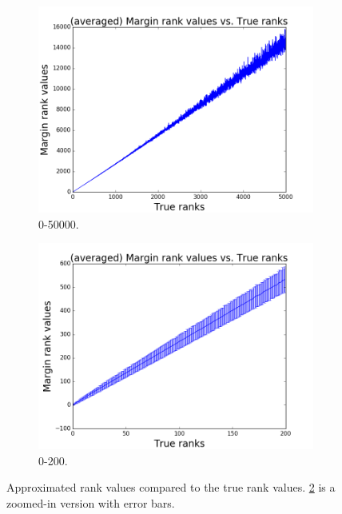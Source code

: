 \documentclass[letterpaper]{article} %
\begin{document}
\begin{figure}
\centering
\begin{subfigure}{.25\textwidth}
  \centering
  \includegraphics[width=.99\linewidth]{pics/quality.png}
  \caption{0-50000.}
  \label{fig:qual1}
\end{subfigure}%
\begin{subfigure}{.25\textwidth}
  \centering
  \includegraphics[width=.99\linewidth]{pics/quality200.png}
  \caption{0-200.}
  \label{fig:qual2}
\end{subfigure}
\caption{Approximated rank values compared to the true rank values. \ref{fig:qual2} is a zoomed-in version with error bars.}
\label{fig:rankapprox}
\end{figure}
\end{document}
